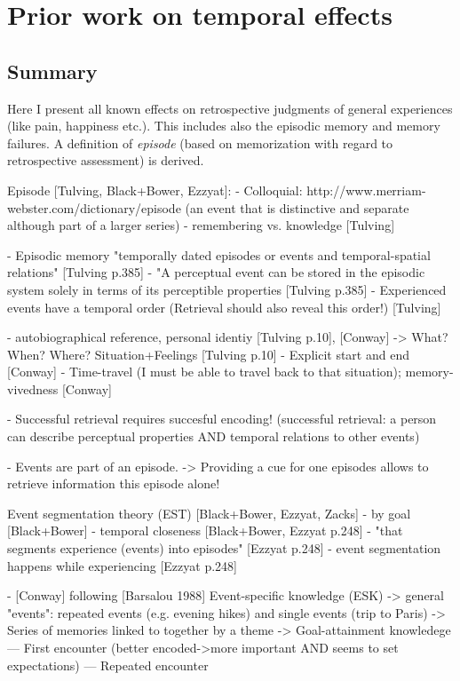 \chapter{Prior work on temporal effects}

\section*{Summary}
Here I present all known effects on retrospective judgments of general experiences (like pain, happiness etc.).
This includes also the episodic memory and memory failures.
A definition of \emph{episode} (based on memorization with regard to retrospective assessment) is derived.

\begin{itemize}
    Episode [Tulving, Black+Bower, Ezzyat]:
    - Colloquial:  http://www.merriam-webster.com/dictionary/episode (an event that is distinctive and separate although part of a larger series)
    - remembering vs. knowledge [Tulving]

    - Episodic memory "temporally dated episodes or events and temporal-spatial relations" [Tulving p.385]
    - "A perceptual event can be stored in the episodic system solely in terms of its perceptible properties [Tulving p.385]
    - Experienced events have a temporal order (Retrieval should also reveal this order!) [Tulving]

    - autobiographical reference, personal identiy [Tulving p.10], [Conway]
    -> What? When? Where? Situation+Feelings [Tulving p.10]
    - Explicit start and end [Conway]
    - Time-travel (I must be able to travel back to that situation); memory-vivedness [Conway]
      
    - Successful retrieval requires succesful encoding! (successful retrieval: a person can describe perceptual properties AND temporal relations to other events)

    - Events are part of an episode.
    -> Providing a cue for one episodes allows to retrieve information this episode alone!
    
    Event segmentation theory (EST) [Black+Bower, Ezzyat, Zacks]
    - by goal [Black+Bower]
    - temporal closeness [Black+Bower, Ezzyat p.248]
    - "that segments experience (events) into episodes" [Ezzyat p.248]
    - event segmentation happens while experiencing [Ezzyat p.248]

    - [Conway] following [Barsalou 1988] Event-specific knowledge (ESK)
    -> general "events": repeated events (e.g. evening hikes) and single events (trip to Paris)
    -> Series of memories linked to together by a theme
    -> Goal-attainment knowledege
    --- First encounter (better encoded->more important AND seems to set expectations)
    --- Repeated encounter
    

\end{itemize}
